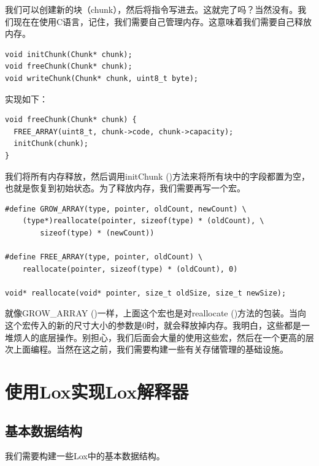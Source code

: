 \documentclass[cn,10pt,math=newtx,citestyle=gb7714-2015,bibstyle=gb7714-2015]{elegantbook}
\newenvironment{code}{\captionsetup{type=listing}}{}
\begin{document}
我们可以创建新的块（chunk），然后将指令写进去。这就完了吗？当然没有。我们现在在使用C语言，记住，我们需要自己管理内存。这意味着我们需要自己释放内存。

\begin{code}
\begin{verbatim}
void initChunk(Chunk* chunk);
void freeChunk(Chunk* chunk);
void writeChunk(Chunk* chunk, uint8_t byte);
\end{verbatim}
\end{code}

实现如下：

\begin{code}
\begin{verbatim}
void freeChunk(Chunk* chunk) {
  FREE_ARRAY(uint8_t, chunk->code, chunk->capacity);
  initChunk(chunk);
}
\end{verbatim}
\end{code}

我们将所有内存释放，然后调用initChunk ()方法来将所有块中的字段都置为空，也就是恢复到初始状态。为了释放内存，我们需要再写一个宏。

\begin{code}
\begin{verbatim}
#define GROW_ARRAY(type, pointer, oldCount, newCount) \
    (type*)reallocate(pointer, sizeof(type) * (oldCount), \
        sizeof(type) * (newCount))

#define FREE_ARRAY(type, pointer, oldCount) \
    reallocate(pointer, sizeof(type) * (oldCount), 0)

void* reallocate(void* pointer, size_t oldSize, size_t newSize);
\end{verbatim}
\end{code}

就像GROW\_ARRAY ()一样，上面这个宏也是对reallocate ()方法的包装。当向这个宏传入的新的尺寸大小的参数是0时，就会释放掉内存。我明白，这些都是一堆烦人的底层操作。别担心，我们后面会大量的使用这些宏，然后在一个更高的层次上面编程。当然在这之前，我们需要构建一些有关存储管理的基础设施。

\part{使用Lox实现Lox解释器}

\chapter{基本数据结构}

我们需要构建一些Lox中的基本数据结构。
\end{document}
